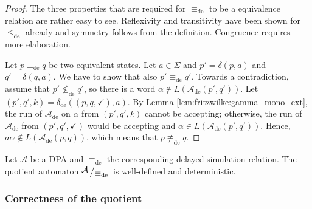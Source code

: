 \begin{proof}
	The three properties that are required for $\equiv_\text{de}$ to be a equivalence relation are rather easy to see. Reflexivity and transitivity have been shown for $\leq_\text{de}$ already and symmetry follows from the definition. Congruence requires more elaboration.

	Let $p \equiv_\text{de} q$ be two equivalent states. Let $a \in \Sigma$ and $p' = \delta(p, a)$ and $q' = \delta(q, a)$. We have to show that also $p' \equiv_\text{de} q'$. Towards a contradiction, assume that $p' \not\leq_\text{de} q'$, so there is a word $\alpha \notin L(\mathcal{A}_\text{de}(p', q'))$. Let $(p', q', k) = \delta_\text{de}((p, q, \checkmark), a)$. By Lemma \ref{lem:fritzwilke:gamma_mono_ext}, the run of $\mathcal{A}_\text{de}$ on $\alpha$ from $(p', q', k)$ cannot be accepting; otherwise, the run of $\mathcal{A}_\text{de}$ from $(p', q', \checkmark)$ would be accepting and $\alpha \in L(\mathcal{A}_\text{de}(p', q'))$. Hence, $a \alpha \notin L(\mathcal{A}_\text{de}(p, q))$, which means that $p \not\equiv_\text{de} q$.
\end{proof}

\begin{cor}
	Let $\mathcal{A}$ be a DPA and $\equiv_\text{de}$ the corresponding delayed simulation-relation. The quotient automaton $\bigslant{\mathcal{A}}{\equiv_\text{de}}$ is well-defined and deterministic.
\end{cor}


\vspace{1cm}
\subsubsection*{Correctness of the quotient}













